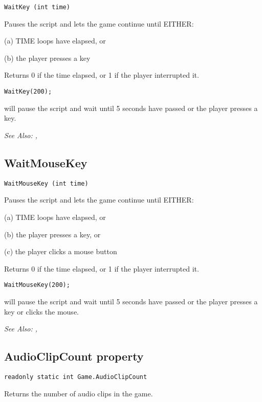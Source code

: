 \begin{verbatim}
WaitKey (int time)
\end{verbatim}
Pauses the script and lets the game continue until EITHER:

(a) TIME loops have elapsed, or

(b) the player presses a key

Returns 0 if the time elapsed, or 1 if the player interrupted it.

\begin{verbatim}
WaitKey(200);
\end{verbatim}
will pause the script and wait until 5 seconds have passed or the player presses a key.

\it{See Also:} , 

\subsection{WaitMouseKey}\label{WaitMouseKey}%

\begin{verbatim}
WaitMouseKey (int time)
\end{verbatim}
Pauses the script and lets the game continue until EITHER:

(a) TIME loops have elapsed, or

(b) the player presses a key, or

(c) the player clicks a mouse button

Returns 0 if the time elapsed, or 1 if the player interrupted it.

\begin{verbatim}
WaitMouseKey(200);
\end{verbatim}
will pause the script and wait until 5 seconds have passed or the player presses a key or
clicks the mouse.

\it{See Also:} , 


\subsection{AudioClipCount property}\label{Game.AudioClipCount}%

\begin{verbatim}
readonly static int Game.AudioClipCount
\end{verbatim}
Returns the number of audio clips in the game.

